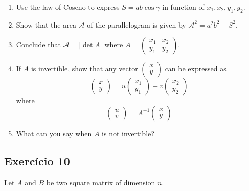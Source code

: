 \begin{enumerate}
\item Use the law of Coseno to express $S = a b \cos \gamma$
  in function of $x_1, x_2, y_1, y_2$.
\item Show that the area $\mathscr A$ of the parallelogram is given by
  ${\mathscr A}^2 = a^2b^2 - S^2$.
\item Conclude that $\mathscr A = \left| \det A \right|$ where
  $A = \begin{pmatrix}
  x_1 & x_2 \\ y_1 & y_2 \end{pmatrix}$.

\item If $A$ is invertible,
  show that any vector $\begin{pmatrix} x \\ y \end{pmatrix}$
  can be expressed as
  $$\begin{pmatrix} x \\ y \end{pmatrix} =
  {u \begin{pmatrix} x_1 \\ y_1 \end{pmatrix}} +
  {v \begin{pmatrix} x_2 \\ y_2 \end{pmatrix}}$$ where
  $$\begin{pmatrix} u \\ v \end{pmatrix} = A^{-1}
  \begin{pmatrix} x \\ y \end{pmatrix}$$
\item What can you say when $A$ is not invertible?
\end{enumerate}

\subsection*{Exercício 10}

Let $A$ and $B$ be two square matrix of dimension $n$.

